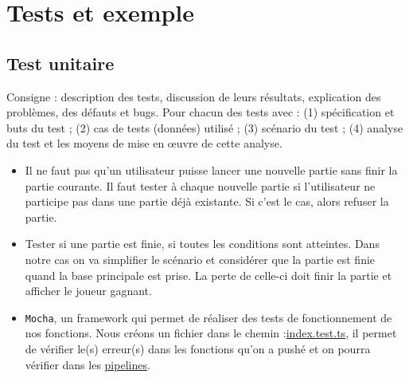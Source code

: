 \section{Tests et exemple}
\subsection{Test unitaire}

Consigne : description des tests, discussion de leurs résultats, explication des problèmes, des défauts et bugs. Pour chacun des tests avec : (1) spécification et buts du test ;
(2) cas de tests (données) utilisé ; (3) scénario du test ; (4) analyse du test et les moyens de mise en œuvre de cette analyse.

\begin{itemize}
    \item Il ne faut pas qu'un utilisateur puisse lancer une nouvelle partie sans finir la partie courante. Il faut tester à chaque nouvelle partie si l'utilisateur ne participe pas dans une partie déjà existante. Si c'est le cas, alors refuser la partie.
    \item Tester si une partie est finie, si toutes les conditions sont atteintes. Dans notre cas on va simplifier le scénario et considérer que la partie est finie quand la base principale est prise. La perte de celle-ci doit finir la partie et afficher le joueur gagnant.
    \item \lstinline{Mocha}, un framework qui permet de réaliser des tests de fonctionnement de nos fonctions. Nous créons un fichier dans le chemin :\href{https://gitlab.emi.u-bordeaux.fr/vsamson/desert-fox/-/blob/main/src/backend/src/test/index.test.ts}{index.test.ts}, il permet de vérifier le(s) erreur(s) dans les fonctions qu'on a pushé et on pourra vérifier dans les \href{https://gitlab.emi.u-bordeaux.fr/vsamson/desert-fox/-/pipelines}{pipelines}.


\end{itemize}

